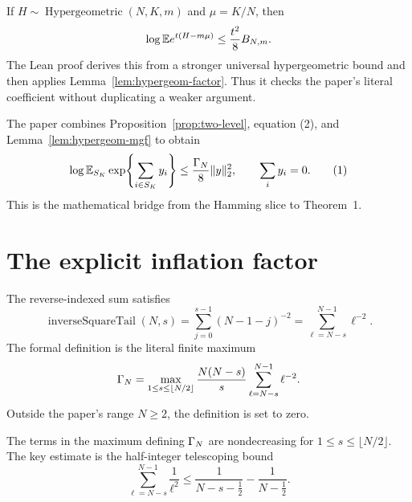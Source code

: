 \begin{lemma}
\label{lem:hypergeom-mgf}
\leanok
{}
If $H\sim\operatorname{Hypergeometric}(N,K,m)$ and $\mu=K/N$, then
\[
  \log\mathbb{E} e^{t(H-m\mu)}\le\frac{t^2}{8}B_{N,m}.
\]
The Lean proof derives this from a stronger universal hypergeometric bound and
then applies Lemma~\ref{lem:hypergeom-factor}.  Thus it checks the paper's
literal coefficient without duplicating a weaker argument.
\end{lemma}

The paper combines Proposition~\ref{prop:two-level}, equation (2), and
Lemma~\ref{lem:hypergeom-mgf} to obtain
\[
  \log\mathbb{E}_{S_K}\exp\!\left\{\sum_{i\in S_K}y_i\right\}
  \le\frac{\Gamma_N}{8}\|y\|_2^2,
  \qquad \sum_i y_i=0.
  \tag{1}
\]
This is the mathematical bridge from the Hamming slice to Theorem~1.

\section{The explicit inflation factor}
\label{sec:gamma}

\begin{definition}
\label{def:gamma}
\leanok
The reverse-indexed sum satisfies
\[
  \operatorname{inverseSquareTail}(N,s)
  =\sum_{j=0}^{s-1}(N-1-j)^{-2}
  =\sum_{\ell=N-s}^{N-1}\ell^{-2}.
\]
The formal definition is the literal finite maximum
\[
  \Gamma_N=
  \max_{1\le s\le\lfloor N/2\rfloor}
  \frac{N(N-s)}s\sum_{\ell=N-s}^{N-1}\ell^{-2}.
\]
Outside the paper's range $N\ge2$, the definition is set to zero.
\end{definition}

\begin{lemma}
\label{lem:gamma-mono}
\leanok
{}
The terms in the maximum defining $\Gamma_N$ are nondecreasing for
$1\le s\le\lfloor N/2\rfloor$.  The key estimate is the half-integer
telescoping bound
\[
  \sum_{\ell=N-s}^{N-1}\frac1{\ell^2}
  \le
  \frac1{N-s-\tfrac12}-\frac1{N-\tfrac12}.
\]
\end{lemma}

